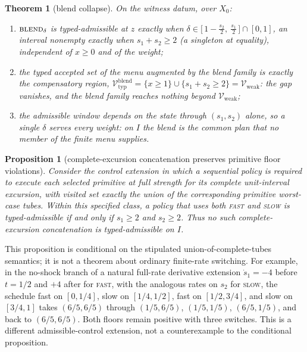 \documentclass[preprint,11pt,authoryear]{elsarticle}
\newtheorem{theorem}{Theorem}
\newtheorem{proposition}{Proposition}
\theoremstyle{definition}
\theoremstyle{remark}
\newcommand{\Vtyp}{\mathcal{V}_{\mathrm{typ}}}
\newcommand{\Vweak}{\mathcal{V}_{\mathrm{weak}}}
\newcommand{\act}[1]{\textsc{#1}}
\begin{document}
\begin{theorem}[blend collapse]\label{thm:blend}
On the witness datum, over $X_0$:
\begin{enumerate}[label=\textup{(\roman*)},leftmargin=2em]
\item $\act{blend}_\delta$ is typed-admissible at $z$ exactly when $\delta\in\big[\,1-\tfrac{s_2}2,\ \tfrac{s_1}2\,\big]\cap[0,1]$, an interval nonempty exactly when $s_1+s_2\ge2$ (a singleton at equality), independent of $x\ge0$ and of the weight;
\item the typed accepted set of the menu augmented by the blend family is exactly the compensatory region,
$\Vtyp^{\mathrm{blend}}=\{x\ge1\}\cup\{s_1+s_2\ge2\}=\Vweak$: the gap vanishes, and the blend family reaches nothing beyond $\Vweak$;
\item the admissible window depends on the state through $(s_1,s_2)$ alone, so a single $\delta$ serves every weight: on $I$ the blend is the common plan that no member of the finite menu supplies.
\end{enumerate}
\end{theorem}

\begin{proposition}[complete-excursion concatenation preserves primitive floor violations]\label{prop:timeshare}
Consider the control extension in which a sequential policy is required to execute each selected primitive at full strength for its complete unit-interval excursion, with visited set exactly the union of the corresponding primitive worst-case tubes. Within this specified class, a policy that uses both \act{fast} and \act{slow} is typed-admissible if and only if $s_1\ge2$ and $s_2\ge2$. Thus no such complete-excursion concatenation is typed-admissible on $I$.
\end{proposition}

This proposition is conditional on the stipulated union-of-complete-tubes semantics; it is not a theorem about ordinary finite-rate switching. For example, in the no-shock branch of a natural full-rate derivative extension $\dot s_1=-4$ before $t=1/2$ and $+4$ after for \act{fast}, with the analogous rates on $s_2$ for \act{slow}, the schedule fast on $[0,1/4]$, slow on $[1/4,1/2]$, fast on $[1/2,3/4]$, and slow on $[3/4,1]$ takes $(6/5,6/5)$ through $(1/5,6/5)$, $(1/5,1/5)$, $(6/5,1/5)$, and back to $(6/5,6/5)$. Both floors remain positive with three switches. This is a different admissible-control extension, not a counterexample to the conditional proposition.
\end{document}
